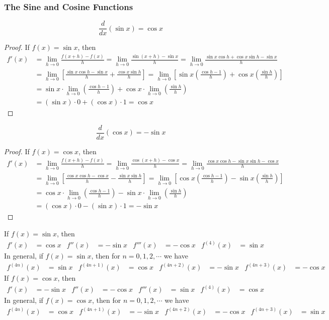 \subsubsection*{The Sine and Cosine Functions}
\[\frac{d}{dx}(\sin x)=\cos x\]
\begin{proof}
    If \(f(x)=\sin x\), then
    \begin{align*}
        f'(x) &= \lim_{h\to 0}\frac{f(x+h)-f(x)}{h}
        =\lim_{h\to 0}\frac{\sin(x+h)-\sin x}{h}
        =\lim_{h\to 0}\frac{\sin x\cos h+\cos x\sin h-\sin x}{h} \\
        &= \lim_{h\to 0}
        \left[\frac{\sin x\cos h-\sin x}{h}+\frac{\cos x\sin h}{h}\right]
        =\lim_{h\to 0}
        \left[\sin x\left(\frac{\cos h-1}{h}\right)
        +\cos x\left(\frac{\sin h}{h}\right)\right] \\
        &= \sin x\cdot\lim_{h\to 0}\left(\frac{\cos h-1}{h}\right)
        +\cos x\cdot\lim_{h\to 0}\left(\frac{\sin h}{h}\right) \\
        &=(\sin x)\cdot 0+(\cos x)\cdot 1=\cos x
    \end{align*}
\end{proof}
\[\frac{d}{dx}(\cos x)=-\sin x\]
\begin{proof}
    If \(f(x)=\cos x\), then
    \begin{align*}
        f'(x) &= \lim_{h\to 0}\frac{f(x+h)-f(x)}{h}
        =\lim_{h\to 0}\frac{\cos(x+h)-\cos x}{h}
        =\lim_{h\to 0}\frac{\cos x\cos h-\sin x\sin h-\cos x}{h} \\
        &= \lim_{h\to 0}
        \left[\frac{\cos x\cos h-\cos x}{h}-\frac{\sin x\sin h}{h}\right]
        =\lim_{h\to 0}
        \left[\cos x\left(\frac{\cos h-1}{h}\right)
        -\sin x\left(\frac{\sin h}{h}\right)\right] \\
        &= \cos x\cdot\lim_{h\to 0}\left(\frac{\cos h-1}{h}\right)
        -\sin x\cdot\lim_{h\to 0}\left(\frac{\sin h}{h}\right) \\
        &=(\cos x)\cdot 0-(\sin x)\cdot 1=-\sin x
    \end{align*}
\end{proof}
If \(f(x)=\sin x\), then
\begin{align*}
    f'(x) &= \cos x & f''(x) &= -\sin x & f'''(x) &= -\cos x
    & f^{(4)}(x) &= \sin x
\end{align*}
In general, if \(f(x)=\sin x\), then for \(n=0,1,2,\cdots\) we have
\begin{align*}
    f^{(4n)}(x) &= \sin x & f^{(4n+1)}(x) &= \cos x & f^{(4n+2)}(x) &= -\sin x
    & f^{(4n+3)}(x) &= -\cos x
\end{align*}
If \(f(x)=\cos x\), then
\begin{align*}
    f'(x) &= -\sin x & f''(x) &= -\cos x & f'''(x) &= \sin x
    & f^{(4)}(x) &= \cos x
\end{align*}
In general, if \(f(x)=\cos x\), then for \(n=0,1,2,\cdots\) we have
\begin{align*}
    f^{(4n)}(x) &= \cos x & f^{(4n+1)}(x) &= -\sin x
    & f^{(4n+2)}(x) &= -\cos x
    & f^{(4n+3)}(x) &= \sin x
\end{align*}